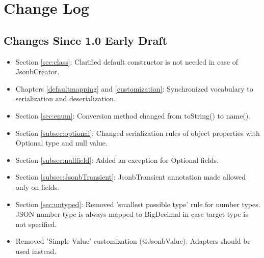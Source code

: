 \chapter{Change Log}

\section{Changes Since 1.0 Early Draft}

\begin{itemize}
\item Section \ref{sec:class}: Clarified default constructor is not needed in case of JsonbCreator.
\item Chapters \ref{defaultmapping} and \ref{customization}: Synchronized vocabulary to serialization and deserialization.
\item Section \ref{sec:enum}: Conversion method changed from toString() to name().
\item Section \ref{subsec:optional}: Changed serialization rules of object properties with Optional type and null value.
\item Section \ref{subsec:nullfield}: Added an exception for Optional fields.
\item Section \ref{subsec:JsonbTransient}: JsonbTransient annotation made allowed only on fields.
\item Section \ref{sec:untyped}: Removed 'smallest possible type' rule for number types. JSON number type is always mapped to BigDecimal in case target type is not specified.
\item Removed 'Simple Value' customization (@JsonbValue). Adapters should be used instead.
\end{itemize}
